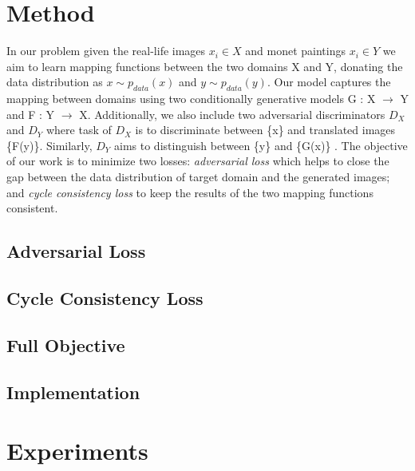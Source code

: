 \documentclass[10pt,twocolumn,letterpaper]{article}
\begin{document}
\section{Method}
In our problem given the real-life images $x_{i}\in X$ and monet paintings $x_{i}\in Y$ we aim to learn mapping functions between the two domains X and Y, donating the data distribution as $x \sim p_{data}(x)$ and $y \sim p_{data}(y)$. Our model captures the mapping between domains using two conditionally generative \cite{imgtoimg} models G : X $\longrightarrow$ Y and F : Y $\longrightarrow$ X. Additionally, we also include two adversarial discriminators $D_{X}$ and $D_{Y}$ where task of $D_{X}$ is to discriminate between \{x\} and translated images \{F(y)\}. Similarly, $D_{Y}$ aims to distinguish between \{y\} and \{G(x)\} \cite{cyclegan}. The objective of our work is to minimize two losses: \emph{adversarial loss} \cite{simplegan} which helps to close the gap between the data distribution of target domain and the generated images; and \emph{cycle consistency loss} to keep the results of the two mapping functions consistent.

\subsection{Adversarial Loss}
\subsection{Cycle Consistency Loss}
\subsection{Full Objective}
\subsection{Implementation}

\section{Experiments}

{\small


}
\end{document}
